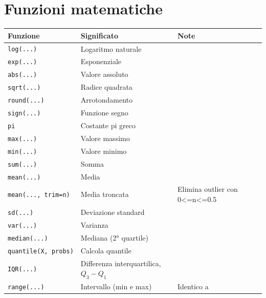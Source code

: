 \documentclass[
  a4paper,
  DIV=11,
  numbers=noendperiod]{scrreprt}
\begin{document}
\section{Funzioni matematiche}\label{funzioni-matematiche}

\begin{longtable}[]{@{}
  >{\raggedright\arraybackslash}p{}
  >{\raggedright\arraybackslash}p{}
  >{\raggedright\arraybackslash}p{}@{}}
\toprule\noalign{}
\begin{minipage}[b]{\linewidth}\raggedright
Funzione
\end{minipage} & \begin{minipage}[b]{\linewidth}\raggedright
Significato
\end{minipage} & \begin{minipage}[b]{\linewidth}\raggedright
Note
\end{minipage} \\
\midrule\noalign{}
\endhead
\bottomrule\noalign{}
\endlastfoot
\texttt{log(...)} & Logaritmo naturale & \\
\texttt{exp(...)} & Esponenziale & \\
\texttt{abs(...)} & Valore assoluto & \\
\texttt{sqrt(...)} & Radice quadrata & \\
\texttt{round(...)} & Arrotondamento & \\
\texttt{sign(...)} & Funzione segno & \\
\texttt{pi} & Costante pi greco & \\
\texttt{max(...)} & Valore massimo & \\
\texttt{min(...)} & Valore minimo & \\
\texttt{sum(...)} & Somma & \\
\texttt{mean(...)} & Media & \\
\texttt{mean(...,\ trim=n)} & Media troncata & Elimina outlier con
0\textless=n\textless=0.5 \\
\texttt{sd(...)} & Deviazione standard & \\
\texttt{var(...)} & Varianza & \\
\texttt{median(...)} & Mediana (2° quartile) & \\
\texttt{quantile(X,\ probs)} & Calcola quantile & \\
\texttt{IQR(...)} & Differenza interquartilica, \(Q_3-Q_1\) & \\
\texttt{range(...)} & Intervallo (min e max) & Identico a

\end{longtable}
\end{document}
